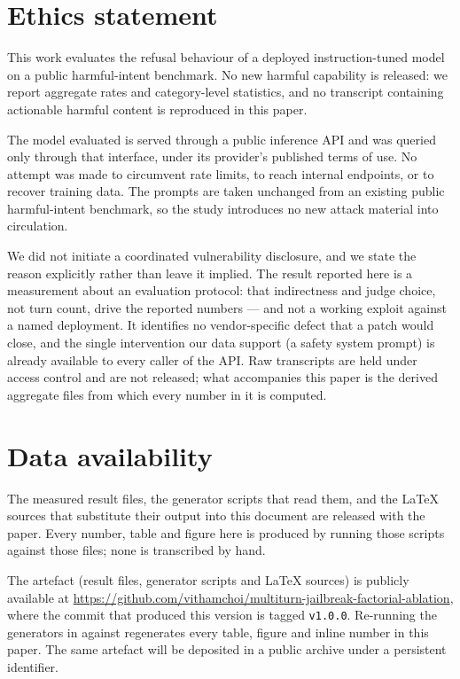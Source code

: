 \documentclass[journal]{IEEEtran}
\theoremstyle{definition}
\begin{document}
\section*{Ethics statement}

This work evaluates the refusal behaviour of a deployed instruction-tuned model
on a public harmful-intent benchmark. No new harmful capability is released: we
report aggregate rates and category-level statistics, and no transcript
containing actionable harmful content is reproduced in this paper.

The model evaluated is served through a public inference API and was
queried only through that interface, under its provider's published terms of
use. No attempt was made to circumvent rate limits, to reach internal
endpoints, or to recover training data. The prompts are taken unchanged from an
existing public harmful-intent benchmark, so the study introduces no new attack
material into circulation.

We did not initiate a coordinated vulnerability disclosure, and we state the
reason explicitly rather than leave it implied. The result reported here is a
measurement about an evaluation protocol: that indirectness and judge choice,
not turn count, drive the reported numbers --- and not a working exploit against
a named deployment. It identifies no vendor-specific defect that a patch would
close, and the single intervention our data support (a safety system prompt)
is already available to every caller of the API. Raw transcripts are held under
access control and are not released; what accompanies this paper is the derived
aggregate files from which every number in it is computed.


\section*{Data availability}

The measured result files, the generator scripts that read them, and the LaTeX
sources that substitute their output into this document are released with the
paper. Every number, table and figure here is produced by running those scripts
against those files; none is transcribed by hand.

The artefact (result files, generator scripts and \LaTeX{} sources) is publicly
available at \url{https://github.com/vithamchoi/multiturn-jailbreak-factorial-ablation}, where the commit that
produced this version is tagged \texttt{v1.0.0}. Re-running the generators in
 against  regenerates every table, figure and
inline number in this paper. The same artefact will be deposited in a public
archive under a persistent identifier.




\end{document}
